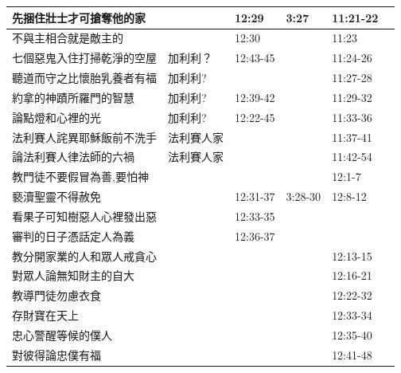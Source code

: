 \begin{table}[H]
\begin{tabular}{p{13.07em}|l|l|l|p{5.285em}|r}
先捆住壯士才可搶奪他的家&\multicolumn{1}{l|}{}& 12:29& 3:27& 11:21-22& \\ \midrule

不與主相合就是敵主的&\multicolumn{1}{l|}{}& 12:30& & 11:23& \\ \midrule


七個惡鬼入住打掃乾淨的空屋&\multicolumn{1}{l|}{加利利？}&12:43-45 & & 11:24-26& \\ \midrule


聽道而守之比懷胎乳養者有福&\multicolumn{1}{l|}{加利利?}& &  & 11:27-28& \\ \midrule
約拿的神蹟所羅門的智慧&\multicolumn{1}{l|}{加利利?}& 12:39-42 &  & 11:29-32 & \\ \midrule
論點燈和心裡的光&\multicolumn{1}{l|}{加利利?}& 12:22-45 &  & 11:33-36 & \\ \midrule

法利賽人詫異耶穌飯前不洗手&法利賽人家 &       &       & 11:37-41&  \\ \midrule
論法利賽人律法師的六禍 &法利賽人家&       &       & 11:42-54 &  \\ \midrule

教門徒不要假冒為善,要怕神&       &       &       &12:1-7&  \\ \midrule
褻瀆聖靈不得赦免&       &    12:31-37 &3:28-30      &12:8-12&  \\ \midrule

看果子可知樹惡人心裡發出惡&       &    12:33-35 & &&  \\ \midrule
審判的日子憑話定人為義&       &    12:36-37 & &&  \\ \midrule

教分開家業的人和眾人戒貪心&       &       &       &12:13-15&  \\ \midrule
對眾人論無知財主的自大&       &       &       &12:16-21&  \\ \midrule
教導門徒勿慮衣食&       &       &       &12:22-32&  \\ \midrule
存財寶在天上&       &       &       &12:33-34&  \\ \midrule
忠心警醒等候的僕人&       &       &       &12:35-40&  \\ \midrule
對彼得論忠僕有福&       &       &       &12:41-48&  \\ \midrule


\end{tabular}
\end{table}
